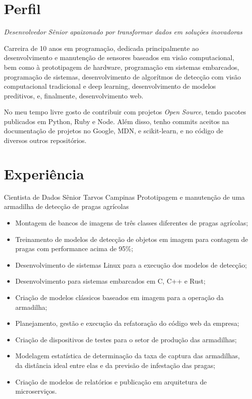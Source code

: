 \documentclass[11pt,a4paper,sans]{moderncv}        %
\begin{document}
\makecvtitle

\section{Perfil}

\setlength{\parskip}{0.5em}
\textit {Desenvolvedor Sênior apaixonado por transformar dados em soluções inovadoras} \par
\setlength{\parindent}{2em}
Carreira de 10 anos em programação, dedicada principalmente ao desenvolvimento e manutenção de sensores baseados em visão computacional, bem como à prototipagem de hardware, programação em sistemas embarcados, programação de sistemas, desenvolvimento de algorítmos de detecção com visão computacional tradicional e deep learning, desenvolvimento de modelos preditivos, e, finalmente, desenvolvimento web.\par

No meu tempo livre gosto de contribuir com projetos \textit{Open Source}, tendo pacotes
publicados em Python, Ruby e Node. Além disso, tenho commits aceitos na documentação de
projetos no Google, MDN, e scikit-learn, e no código de diversos outros repositórios.
\setlength{\parindent}{0em}

\section{Experiência}
{Cientista de Dados Sênior}
{Tarvos}
{Campinas}{}
{Prototipagem e manutenção de uma armadilha de detecção de pragas agrícolas}
\begin{itemize}%
	\item Montagem de bancos de imagens de três classes diferentes de pragas agrícolas;
	\item Treinamento de modelos de detecção de objetos em imagem para contagem de pragas com performance acima de 95\%;
	\item Desenvolvimento de sistemas Linux para a execução dos modelos de detecção;
	\item Desenvolvimento para sistemas embarcados em C, C++ e Rust;
	\item Criação de modelos clássicos baseados em imagem para a operação da armadilha;
	\item Planejamento, gestão e execução da refatoração do código web da empresa;
	\item Criação de dispositivos de testes para o setor de produção das armadilhas;
	\item Modelagem estatística de determinação da taxa de captura das armadilhas, da distância ideal entre elas e da previsão de infestação das pragas;
	\item Criação de modelos de relatórios e publicação em arquitetura de microserviços.
\end{itemize}
\end{document}

